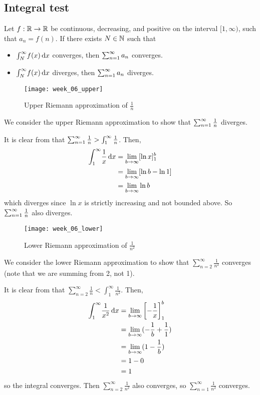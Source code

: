 \subsection{Integral test}
\begin{test}
  Let $f: \mathbb{R} \to \mathbb{R}$ be continuous, decreasing, and positive on the interval $[1, \infty)$, such that $a_n = f(n)$. If there exists $N \in \mathbb{N}$ such that
  \begin{itemize}
    \item $\int_N^\infty\! f(x) \operatorname{d\!} x$ converges, then $\sum_{n = 1} ^ \infty a_n$ converges.
    \item $\int_N^\infty\! f(x) \operatorname{d\!} x$ diverges, then $\sum_{n = 1} ^ \infty a_n$ diverges.
  \end{itemize}
\end{test}
\begin{figure}[!htbp]
  \centering
  \texttt{[image: week\_06\_upper]}
  \caption{Upper Riemann approximation of $\frac{1}{n}$}
  \label{fig:week_06_upper}
\end{figure}
\begin{eg}
  We consider the upper Riemann approximation to show that $\sum_{n = 1} ^ \infty \frac{1}{n}$ diverges.
  
  It is clear from  that $\sum_{n = 1} ^ \infty \frac{1}{n} > \int_1^{\infty} \frac{1}{n}$. Then,
  \begin{align*}
    \int_1^{\infty}\! \frac{1}{x} \di x &= \lim_{b \to \infty} [\ln x]_1^b \\ 
    &= \lim_{b \to \infty} [\ln b - \ln 1] \\ 
    &= \lim_{b \to \infty} \ln b
  \end{align*}
  which diverges since $\ln x$ is strictly increasing and not bounded above. So $\sum_{n = 1} ^ \infty \frac{1}{n}$ also diverges.
\end{eg}
\begin{figure}[!htbp]
  \centering
  \texttt{[image: week\_06\_lower]}
  \caption{Lower Riemann approximation of $\frac{1}{n ^ 2}$}
  \label{fig:week_06_lower}
\end{figure}
\begin{eg}
  We consider the lower Riemann approximation to show that $\sum_{n = 2}^\infty \frac{1}{n ^ 2}$ converges (note that we are summing from 2, not 1).
  
  It is clear from  that $\sum_{n = 2}^\infty \frac{1}{n} < \int_1^{\infty} \frac{1}{n ^ 2}$. Then,
  \begin{align*}
    \int_1^{\infty}\! \frac{1}{x ^ 2} \di x &= \lim_{b \to \infty} \left[-\frac{1}{x}\right]_1^b \\ 
    &= \lim_{b \to \infty} (-\frac{1}{b} + \frac{1}{1}) \\ 
    &= \lim_{b \to \infty} (1 - \frac{1}{b}) \\ 
    &= 1 - 0 \\ 
    &= 1
  \end{align*}
  so the integral converges. Then $\sum_{n = 2}^\infty \frac{1}{n ^ 2}$ also converges, so $\sum_{n = 1}^\infty \frac{1}{n ^ 2}$ converges.
\end{eg}
